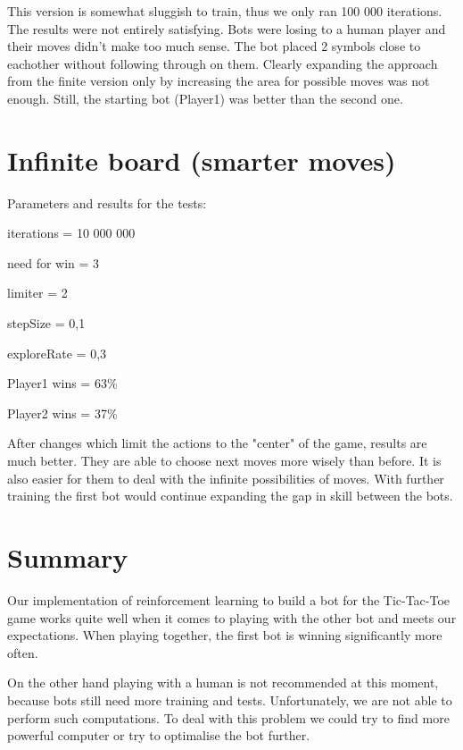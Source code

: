 \documentclass[a4paper,12pt]{book}
\begin{document}
This version is somewhat sluggish to train, thus we only ran 100 000 iterations. The results were not entirely satisfying. Bots were losing to a human player and their moves didn't make too much sense. The bot placed 2 symbols close to eachother without following through on them. Clearly expanding the approach from the finite version only by increasing the area for possible moves was not enough. Still, the starting bot (Player1) was better than the second one.

 	\section{Infinite board (smarter moves)}

Parameters and results for the tests:

\begin{description}
	\item iterations = 10 000 000
	\item need for win = 3
	\item limiter = 2
	\item stepSize = 0,1
	\item exploreRate = 0,3
	\item Player1 wins = 63\%
	\item Player2 wins = 37\%
\end{description}

After changes which limit the actions to the "center" of the game, results are much better. They are able to choose next moves more wisely than before. It is also easier for them to deal with the infinite possibilities of moves. With further training the first bot would continue expanding the gap in skill between the bots.

 	\section{Summary}

Our implementation of reinforcement learning to build a bot for the Tic-Tac-Toe game works quite well when it comes to playing with the other bot and meets our expectations. When playing together, the first bot is winning significantly more often. 

On the other hand playing with a human is not recommended at this moment, because bots still need more training and tests. Unfortunately, we are not able to perform such computations. To deal with this problem we could try to find more powerful computer or try to optimalise the bot further. 
\end{document}
